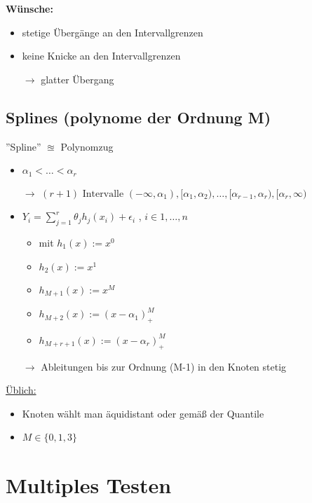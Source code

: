 

	\textbf{Wünsche: } \begin{itemize}
		\item stetige Übergänge an den Intervallgrenzen
		\item keine Knicke an den Intervallgrenzen
		\item [$\rightarrow$] glatter Übergang
	\end{itemize}

\subsection{Splines (polynome der Ordnung M)}
''Spline'' $\approxeq$ Polynomzug

\begin{itemize}
	\item $ \alpha_1 < \ldots < \alpha_r $
	\item[$\rightarrow$] $(r+1) \text{ Intervalle }  (-\infty, \alpha_1),[\alpha_1, \alpha_2) , \ldots, [\alpha_{r-1} , \alpha_r), [\alpha_r, \infty)$
	\item $Y_i  = \sum_{j=1}^{r} \theta_j h_j (x_i) + \epsilon_i$ , $i \in {1,\ldots,n}$
	\item [] 
	\begin{itemize}
		\item mit $h_1(x):=x^0$
		\item $h_2(x) := x^1$
		\item $h_{M+1}(x) := x^{M}$
		\item $h_{M+2}(x) := (x- \alpha_1)^{M}_{+}$
		\item $h_{M+r+1}(x) := (x- \alpha_r)^{M}_{+}$
	\end{itemize} 

\item[$\rightarrow$] Ableitungen bis zur Ordnung (M-1) in den Knoten stetig
\end{itemize}
\underline{Üblich:} 
\begin{itemize}
	\item Knoten wählt man äquidistant oder gemäß der Quantile
	\item $M \in \{0,1,3\}$
\end{itemize}



\section{Multiples Testen}
